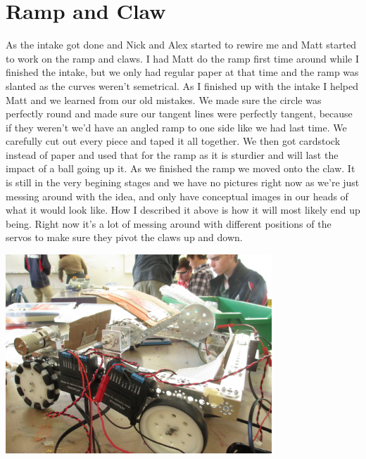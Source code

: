 \section*{Ramp and Claw}
As the intake got done and Nick and Alex started to rewire me and Matt started to work on the ramp and claws. I had Matt do the ramp first time around while I finished the intake, but we only had regular paper at that time and the ramp was slanted as the curves weren't semetrical. As I finished up with the intake I helped Matt and we learned from our old mistakes. We made sure the circle was perfectly round and made sure our tangent lines were perfectly tangent, because if they weren't we'd have an angled ramp to one side like we had last time. We carefully cut out every piece and taped it all together. We then got cardstock instead of paper and used that for the ramp as it is sturdier and will last the impact of a ball going up it. As we finished the ramp we moved onto the claw. It is still in the very begining stages and we have no pictures right now as we're just messing around with the idea, and only have conceptual images in our heads of what it would look like. How I described it above is how it will most likely end up being. Right now it's a lot of messing around with different positions of the servos to make sure they pivot the claws up and down. 

\begin{center}
\includegraphics[width=10cm]{./Entries/Images/RobotDesignForNovemberTwentyFirstTwoThousandAndFourteenWithIntakeLauncherAndRampWiringIncludedILoveAlexHeIsTheBestNic.jpg}
\end{center}
